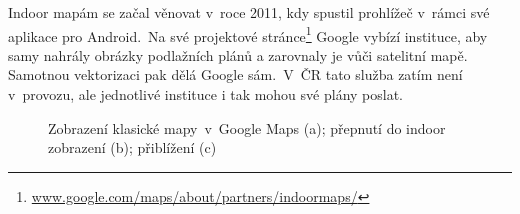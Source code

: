 Indoor mapám se začal věnovat v~roce 2011, kdy spustil prohlížeč v~rámci své aplikace pro Android.\cite{zdroj15}~Na své projektové stránce\footnote{\href{https://www.google.com/maps/about/partners/indoormaps/}{www.google.com/maps/about/partners/indoormaps/}} Google vybízí instituce, aby samy nahrály obrázky podlažních plánů a zarovnaly je vůči satelitní mapě. Samotnou vektorizaci pak dělá Google sám.\cite{zdroj16}~V~ČR tato služba zatím není v~provozu, ale jednotlivé instituce i tak mohou své plány poslat.\cite{zdroj17}


                      \begin{figure}
                     \centering
                    \hfill
                    \hfill

                    \caption{Zobrazení klasické mapy~v~Google Maps (a); přepnutí do indoor zobrazení (b); přiblížení (c)}
                    \label{obr2}
                    \end{figure}
                    

